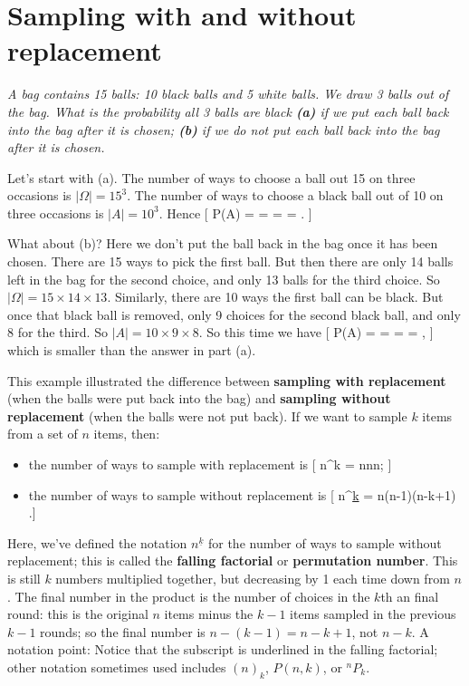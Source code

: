 \documentclass[
  letterpaper,
  DIV=11,
  numbers=noendperiod]{scrreprt}
\providecommand{\tightlist}{%
  \setlength{\itemsep}{0pt}\setlength{\parskip}{0pt}}\usepackage{longtable,booktabs,array}
\theoremstyle{remark}
\begin{document}
\hypertarget{sampling}{%
\section{Sampling with and without replacement}\label{sampling}}

\emph{A bag contains 15 balls: 10 black balls and 5 white balls. We draw
3 balls out of the bag. What is the probability all 3 balls are black
\textbf{(a)} if we put each ball back into the bag after it is chosen;
\textbf{(b)} if we do not put each ball back into the bag after it is
chosen.}

Let's start with (a). The number of ways to choose a ball out 15 on
three occasions is \(|\Omega| = 15^3\). The number of ways to choose a
black ball out of 10 on three occasions is \(|A| = 10^3\). Hence {[}
\mathbb P(A) =  =  =
 =  . {]}

What about (b)? Here we don't put the ball back in the bag once it has
been chosen. There are 15 ways to pick the first ball. But then there
are only 14 balls left in the bag for the second choice, and only 13
balls for the third choice. So \(|\Omega| = 15\times14\times13\).
Similarly, there are 10 ways the first ball can be black. But once that
black ball is removed, only 9 choices for the second black ball, and
only 8 for the third. So \(|A| = 10\times9\times8\). So this time we
have {[} \mathbb P(A) =  =
 =  =
 , {]} which is smaller than the answer in part
(a).

This example illustrated the difference between \textbf{sampling with
replacement} (when the balls were put back into the bag) and
\textbf{sampling without replacement} (when the balls were not put
back). If we want to sample \(k\) items from a set of \(n\) items, then:

\begin{itemize}
\tightlist
\item
  the number of ways to sample with replacement is {[} n\^{}k =
  n\times n\times\cdots\times n; {]}
\item
  the number of ways to sample without replacement is {[}
  {n}^{\underline{k}} = n\times(n-1)\times \cdots\times (n-k+1) .{]}
\end{itemize}

Here, we've defined the notation \({n}^{\underline{k}}\) for the number
of ways to sample without replacement; this is called the
\textbf{falling factorial} or \textbf{permutation number}. This is still
\(k\) numbers multiplied together, but decreasing by 1 each time down
from \(n\). The final number in the product is the number of choices in
the \(k\)th an final round: this is the original \(n\) items minus the
\(k-1\) items sampled in the previous \(k-1\) rounds; so the final
number is \(n - (k-1) = n - k + 1\), not \(n - k\). A notation point:
Notice that the subscript is underlined in the falling factorial; other
notation sometimes used includes \((n)_k\), \(P(n,k)\), or \({}^nP_k\).
\end{document}
